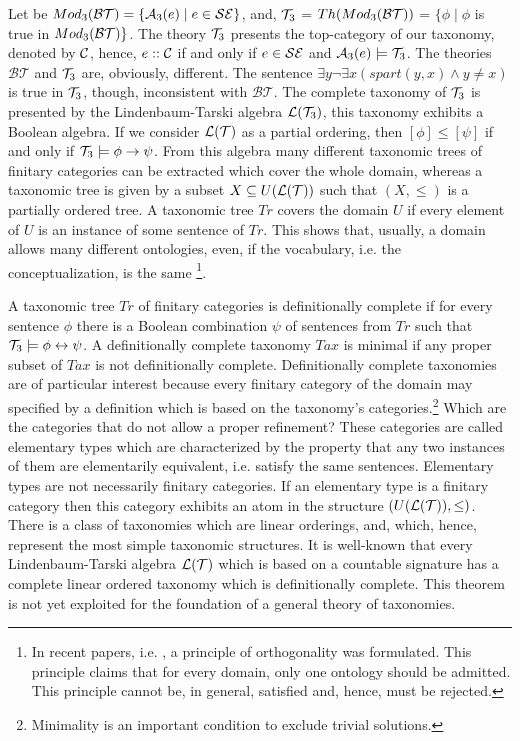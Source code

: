 \documentclass{ao2e}
\begin{document}
{Let be $Mod_3 ({\cal BT}) = \{ {\cal A}_3 (e) \; | \; e \in {\cal SE} \}$, and,
${\cal T}_3$ = $Th (Mod_3 ({\cal BT}))$ = $ \{ \phi \; | \; \phi$ is true in $Mod_3 ({\cal BT}) \}$.
The theory ${\cal T}_3$ presents the top-category of our taxonomy, denoted by ${\cal C}$, hence,
$e :: {\cal C}$ if and only if $e \in {\cal SE}$ and ${\cal A}_3 (e) \models {\cal T}_3$. The theories 
$\mathcal{BT}$ and ${\cal T}_3$ are, obviously, different. The sentence $\exists y \neg \exists x (spart(y,x) \wedge  y\not= x)$ is true in ${\cal T}_3$, though, inconsistent with $\mathcal{BT}$. The complete taxonomy of ${\cal T}_3$ is 
presented by the Lindenbaum-Tarski algebra ${\cal L} ({\cal T}_3)$, this taxonomy exhibits a Boolean
algebra. If we consider ${\cal L}({\cal T})$ as a partial ordering, then $[\phi] \le [\psi]$ if and only if
${\cal T}_3 \models \phi \rightarrow \psi$.  From this algebra many different taxonomic trees of finitary categories can be extracted which cover the whole domain, whereas a taxonomic tree is given by a subset $X \subseteq U({\cal L}({\cal T}))$ such that
$(X, \le)$ is a partially ordered tree. A taxonomic tree $Tr$ covers the domain $U$ if every element of $U$ is an instance of
some sentence of $Tr$. This shows that, usually, a domain allows many different ontologies, even, if the vocabulary, i.e. the conceptualization,  is the same \footnote{In recent papers, i.e. \cite{smith-b-2008-a}, a principle of orthogonality was formulated. This principle claims that for every domain, only one ontology should be admitted. This principle cannot be, in general, satisfied and, hence, must be rejected.}.

A taxonomic tree $Tr$ of finitary categories is definitionally complete if for every sentence $\phi$ there is
a Boolean combination $\psi$ of sentences from $Tr$ such that ${\cal T}_3 \models \phi \leftrightarrow \psi$.
A definitionally complete taxonomy $Tax$ is minimal if any proper subset of $Tax$ is not definitionally complete.
Definitionally complete taxonomies are of particular interest because every finitary category of the domain
may specified by a definition which is based on the taxonomy's categories.\footnote{Minimality is an important condition to exclude trivial solutions.} Which are the categories that do not allow a proper refinement? These categories are called elementary types which are characterized by the property that any two instances of them are elementarily equivalent, i.e. satisfy the same sentences. Elementary types are not necessarily finitary categories. If an elementary type is a finitary category then this category exhibits
an atom in the structure $(U({\cal L}({\cal T})), \le)$. There is a class of taxonomies which are linear orderings, and, which, hence, represent the most simple taxonomic structures. It is well-known that every Lindenbaum-Tarski algebra ${\cal L}({\cal T})$ which is based on a countable signature has a complete linear ordered taxonomy which is definitionally complete. This theorem is not yet exploited for  the foundation of a general theory of taxonomies.

}
\end{document}
